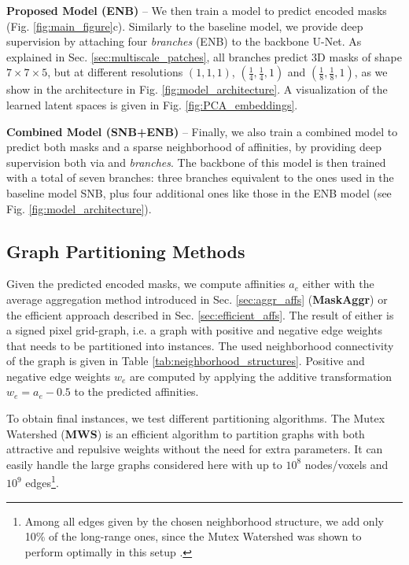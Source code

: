 \textbf{Proposed Model (ENB)} -- We then train a model to predict encoded \maskname masks (Fig. \ref{fig:main_figure}c). Similarly to the baseline model, we provide deep supervision by attaching four \emph{\encBr branches} (ENB) to the backbone U-Net. As explained in Sec. \ref{sec:multiscale_patches}, all branches predict 3D masks of shape $7 \times 7 \times 5$, but at different resolutions $(1,1,1)$, $(\frac{1}{4},\frac{1}{4},1)$ and $(\frac{1}{8},\frac{1}{8},1)$, as we show in the architecture in Fig. \ref{fig:model_architecture}. A visualization of the learned latent spaces is given in Fig. \ref{fig:PCA_embeddings}.

\textbf{Combined Model (SNB+ENB)} -- Finally, we also train a combined model to predict both \maskname masks and a sparse neighborhood of affinities, by providing deep supervision both via \emph{\encBr} and \emph{\sparseBr} \emph{branches}. The backbone of this model is then trained with a total of seven branches: three branches equivalent to the ones used in the baseline model SNB, plus four additional ones like those in the ENB model (see Fig. \ref{fig:model_architecture}).  

\subsection{Graph Partitioning Methods} 
Given the predicted encoded \maskname masks, we compute affinities $a_e$ either with the average aggregation method introduced in Sec. \ref{sec:aggr_affs} (\textbf{MaskAggr}) or the efficient approach described in Sec. \ref{sec:efficient_affs}. 
The result of either is a signed pixel grid-graph, i.e. a graph with positive and negative edge weights that needs to be partitioned into instances. 
The used neighborhood connectivity of the graph is given in Table \ref{tab:neighborhood_structures}. Positive and negative edge weights $w_e$ are computed by applying the additive transformation $w_e=a_e-0.5$ to the predicted affinities.


To obtain final instances, we test different partitioning algorithms.
The Mutex Watershed (\textbf{MWS}) \cite{wolf2018mutex} is an efficient algorithm to partition graphs with both attractive and repulsive weights without the need for extra parameters. It can easily handle the large graphs considered here with up to $10^8$ nodes/voxels and $10^9$ edges\footnote{Among all edges given by the chosen neighborhood structure, we add only 10\% of the long-range ones, since the Mutex Watershed was shown to perform optimally in this setup \cite{bailoni2019generalized,wolf2018mutex}.}. 

